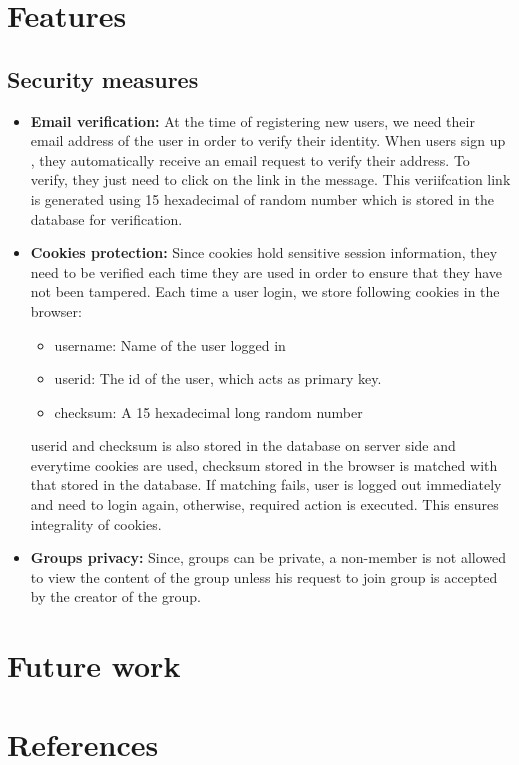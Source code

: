 \documentclass{article}
\begin{document}
\section{Features}
\subsection{Security measures}
\begin{itemize}
\item \textbf{Email verification:} At the time of registering new users, we need their email address of the user in order to verify their identity. When users sign up , they automatically receive an email request to verify their address. To verify, they just need to click on the link in the message. This veriifcation link is generated using 15 hexadecimal of random number which is stored in the database for verification.
\item \textbf{Cookies protection:} Since cookies hold sensitive session information, they need to be verified each time they are used in order to ensure that they have not been tampered. Each time a user login, we store following cookies in the browser:
\begin{itemize}
\item username: Name of the user logged in
\item userid: The id of the user, which acts as primary key.
\item checksum: A 15 hexadecimal long random number
\end{itemize}
userid and checksum is also stored in the database on server side and everytime cookies are used, checksum stored in the browser is matched with that stored in the database. If matching fails, user is logged out immediately and need to login again, otherwise, required action is executed. This ensures integrality of cookies. 
\item \textbf{Groups privacy:} Since, groups can be private, a non-member is not allowed to view the content of the group unless his request to join group is accepted by the creator of the group.
\end{itemize}
\section{Future work}

\section{References}
\end{document}
